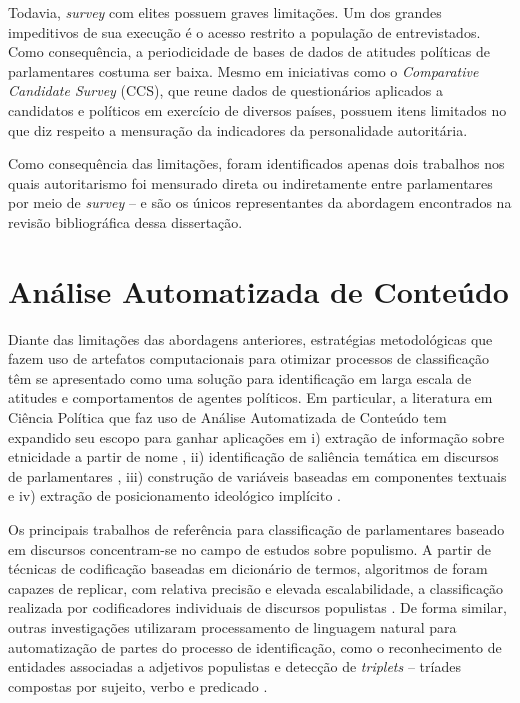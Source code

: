 \documentclass[
12pt,				%
openright,			%
twoside,			%
a4paper,			%
english,			%
french,				%
spanish,			%
brazil				%
]{abntex2}
\begin{document}
Todavia, \emph{survey} com elites possuem graves limitações. Um dos grandes impeditivos de sua execução é o acesso restrito a população de entrevistados. Como consequência, a periodicidade de bases de dados de atitudes políticas de parlamentares costuma ser baixa. Mesmo em iniciativas como o \emph{Comparative Candidate Survey} (CCS), que reune dados de questionários aplicados a candidatos e políticos em exercício de diversos países, possuem itens limitados no que diz respeito a mensuração da indicadores da personalidade autoritária. 

Como consequência das limitações, foram identificados apenas dois trabalhos nos quais autoritarismo foi mensurado direta ou indiretamente entre parlamentares por meio de \emph{survey} --  e  são os únicos representantes da abordagem encontrados na revisão bibliográfica dessa dissertação. 


\section{Análise Automatizada de Conteúdo}

Diante das limitações das abordagens anteriores, estratégias metodológicas que fazem uso de artefatos computacionais para otimizar processos de classificação têm se apresentado como uma solução para identificação em larga escala de atitudes e comportamentos de agentes políticos. Em particular, a literatura em Ciência Política que faz uso de Análise Automatizada de Conteúdo tem expandido seu escopo para ganhar aplicações em i) extração de informação sobre etnicidade a partir de nome \cite{roberts2016introduction}, ii) identificação de saliência temática em discursos de parlamentares \cite{batista2016mensurando, moreira2016palavra}, iii) construção de variáveis baseadas em componentes textuais \cite{curini2015conditional} e iv) extração de posicionamento ideológico implícito \cite{slapin2008scaling, ceron2016first}.

Os principais trabalhos de referência para classificação de parlamentares baseado em discursos concentram-se no campo de estudos sobre populismo. A partir de técnicas de codificação baseadas em dicionário de termos, algoritmos de foram capazes de replicar, com relativa precisão e elevada escalabilidade, a classificação realizada por codificadores individuais de discursos populistas \cite{pauwels2011measuring, rooduijn2011measuring, oliver2016rise}. De forma similar, outras investigações utilizaram processamento de linguagem natural para automatização de partes do processo de identificação, como o reconhecimento de entidades associadas a adjetivos populistas \cite{kyle2018populists} e detecção de \emph{triplets} -- tríades compostas por sujeito, verbo e predicado \cite{aslanidis2018measuring}.
\end{document}
